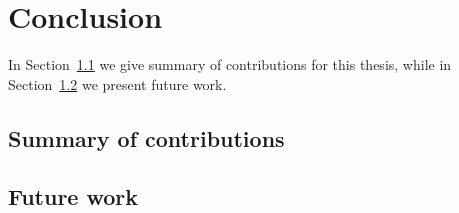 \chapter{Conclusion}\label{chapter:Conclusion}
%
In Section~\ref{sec:summary_of_contributions} we give summary of contributions for this thesis, while in Section~\ref{sec:future_work} we present future work.
%
%
\section{Summary of contributions}\label{sec:summary_of_contributions}
%
%

\section{Future work}\label{sec:future_work}
%
%